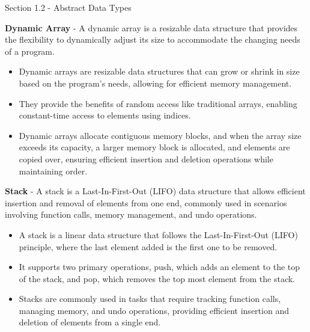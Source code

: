 \begin{notes}{Section 1.2 - Abstract Data Types}
    \begin{highlight}
        \textbf{Dynamic Array} - A dynamic array is a resizable data structure that provides the flexibility to dynamically adjust its size to accommodate the changing
        needs of a program.
        \begin{itemize}
            \item Dynamic arrays are resizable data structures that can grow or shrink in size based on the program's needs, allowing for efficient memory management.
            \item They provide the benefits of random access like traditional arrays, enabling constant-time access to elements using indices.
            \item Dynamic arrays allocate contiguous memory blocks, and when the array size exceeds its capacity, a larger memory block is allocated, and elements are copied over,
            ensuring efficient insertion and deletion operations while maintaining order.
        \end{itemize}
    \end{highlight}

    \begin{highlight}[Stack]
        \textbf{Stack} - A stack is a Last-In-First-Out (LIFO) data structure that allows efficient insertion and removal of elements from one end, commonly used in scenarios
        involving function calls, memory management, and undo operations.
        \begin{itemize}
            \item A stack is a linear data structure that follows the Last-In-First-Out (LIFO) principle, where the last element added is the first one to be removed.
            \item It supports two primary operations, push, which adds an element to the top of the stack, and pop, which removes the top most element from the stack.
            \item Stacks are commonly used in tasks that require tracking function calls, managing memory, and undo operations, providing efficient insertion and deletion of elements from
            a single end.
        \end{itemize}
    \end{highlight}


\end{notes}
